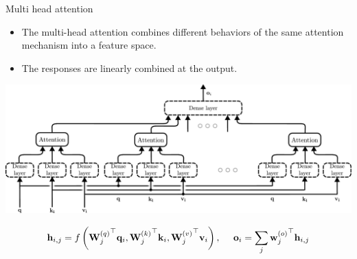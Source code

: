 \documentclass{beamer}
\begin{document}
\begin{frame}{Multi head attention}
\begin{itemize}
    \item The multi-head attention combines different behaviors of the same attention mechanism into a feature space.
    \item The responses are linearly combined at the output.
\end{itemize}
\begin{center}
    \includegraphics[scale=0.3]{Module 6 (Attention-based networks)/pics/multihead_attention.pdf}
\end{center}
    \begin{equation}
        {\bf h}_{i,j} = f\left({{\bf W}^{(q)}_j}^\top {\bf q}_i,{{\bf W}^{(k)}_j}^\top {\bf k}_i, {{\bf W}^{(v)}_j}^\top {\bf v}_i    \right), ~~~~{\bf o}_i=\sum_j {{\bf w}_j^{(o)}}^\top {\bf h}_{i,j}
    \end{equation}
\end{frame}
\end{document}
